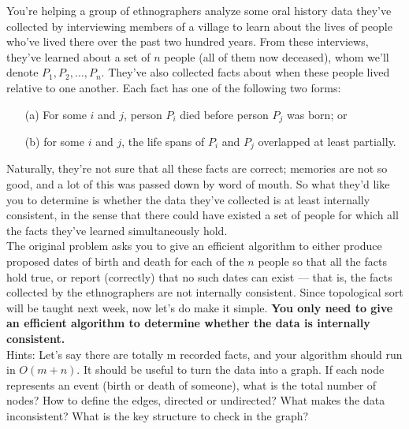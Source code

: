 \noindent {}
You’re helping a group of ethnographers analyze some oral history data they’ve collected by interviewing members of a village to learn about the lives of people who’ve lived there over the past two hundred years. From these interviews, they’ve learned about a set of $n$ people (all of them now deceased), whom we’ll denote $P_1, P_2, \dots, P_n$. They’ve also collected facts about when these people lived relative to one another. Each fact has one of the following two forms:
\begin{itemize}
    \item[(a)] For some $i$ and $j$, person $P_i$ died before person $P_j$ was born; or
    \item[(b)] for some $i$ and $j$, the life spans of $P_i$ and $P_j$ overlapped at least partially. 
\end{itemize}
Naturally, they’re not sure that all these facts are correct; memories are not so good, and a lot of this was passed down by word of mouth. So what they’d like you to determine is whether the data they’ve collected is at least internally consistent, in the sense that there could have existed a set of people for which all the facts they’ve learned simultaneously hold. \\
The original problem asks you to give an efficient algorithm to either produce proposed dates of birth and death for each of the $n$ people so that all the facts hold true, or report (correctly) that no such dates can exist — that is, the facts collected by the ethnographers are not internally consistent. Since topological sort will be taught next week, now let’s do make it simple. \textbf{You only need to give an efficient algorithm to determine whether the data is internally consistent.} \\
Hints: Let’s say there are totally m recorded facts, and your algorithm should run in $O(m+n)$. It should be useful to turn the data into a graph. If each node represents an event (birth or death of someone), what is the total number of nodes? How to define the edges, directed or undirected? What makes the data inconsistent? What is the key structure to check in the graph? \\


